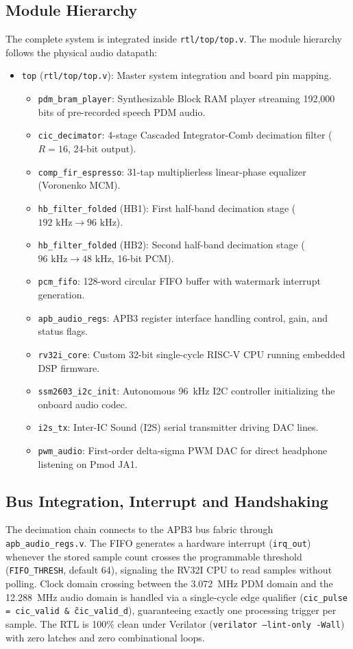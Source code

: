 \documentclass[11pt,a4paper]{article}
\begin{document}
\subsection{Module Hierarchy}
The complete system is integrated inside \texttt{rtl/top/top.v}. The module hierarchy follows the physical audio datapath:
\begin{itemize}
  \item \texttt{top} (\texttt{rtl/top/top.v}): Master system integration and board pin mapping.
  \begin{itemize}
    \item \texttt{pdm\_bram\_player}: Synthesizable Block RAM player streaming 192,000 bits of pre-recorded speech PDM audio.
    \item \texttt{cic\_decimator}: 4-stage Cascaded Integrator-Comb decimation filter ($R=16$, 24-bit output).
    \item \texttt{comp\_fir\_espresso}: 31-tap multiplierless linear-phase equalizer (Voronenko MCM).
    \item \texttt{hb\_filter\_folded} (HB1): First half-band decimation stage ($192\text{ kHz} \to 96\text{ kHz}$).
    \item \texttt{hb\_filter\_folded} (HB2): Second half-band decimation stage ($96\text{ kHz} \to 48\text{ kHz}$, 16-bit PCM).
    \item \texttt{pcm\_fifo}: 128-word circular FIFO buffer with watermark interrupt generation.
    \item \texttt{apb\_audio\_regs}: APB3 register interface handling control, gain, and status flags.
    \item \texttt{rv32i\_core}: Custom 32-bit single-cycle RISC-V CPU running embedded DSP firmware.
    \item \texttt{ssm2603\_i2c\_init}: Autonomous 96~kHz I2C controller initializing the onboard audio codec.
    \item \texttt{i2s\_tx}: Inter-IC Sound (I2S) serial transmitter driving DAC lines.
    \item \texttt{pwm\_audio}: First-order delta-sigma PWM DAC for direct headphone listening on Pmod JA1.
  \end{itemize}
\end{itemize}

\subsection{Bus Integration, Interrupt and Handshaking}
The decimation chain connects to the APB3 bus fabric through \texttt{apb\_audio_regs.v}. The FIFO generates a hardware interrupt (\texttt{irq_out}) whenever the stored sample count crosses the programmable threshold (\texttt{FIFO\_THRESH}, default 64), signaling the RV32I CPU to read samples without polling. Clock domain crossing between the 3.072~MHz PDM domain and the 12.288~MHz audio domain is handled via a single-cycle edge qualifier (\texttt{cic_pulse = cic_valid \& \~cic_valid_d}), guaranteeing exactly one processing trigger per sample. The RTL is 100\% clean under Verilator (\texttt{verilator --lint-only -Wall}) with zero latches and zero combinational loops.
\end{document}
